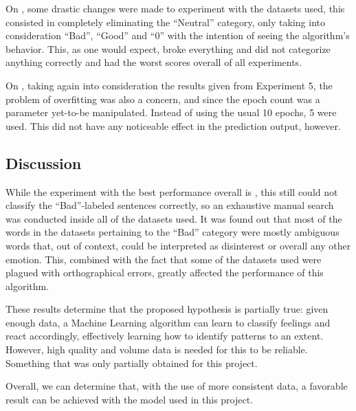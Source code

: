 On , some drastic changes were made to experiment with the datasets used, this consisted in completely eliminating the ``Neutral'' category, only taking into consideration ``Bad'', ``Good'' and ``0'' with the intention of seeing the algorithm's behavior. This, as one would expect, broke everything and did not categorize anything correctly and had the worst scores overall of all experiments. 

On , taking again into consideration the results given from Experiment 5, the problem of overfitting was also a concern, and since the epoch count was a parameter yet-to-be manipulated. Instead of using the usual 10 epochs, 5 were used. This did not have any noticeable effect in the prediction output, however.

\subsection{Discussion}
While the experiment with the best performance overall is , this still could not classify the ``Bad''-labeled sentences correctly, so an exhaustive manual search was conducted inside all of the datasets used. It was found out that most of the words in the datasets pertaining to the ``Bad'' category were mostly ambiguous words that, out of context, could be interpreted as disinterest or overall any other emotion. This, combined with the fact that some of the datasets used were plagued with orthographical errors, greatly affected the performance of this algorithm.

These results determine that the proposed hypothesis is partially true: given enough data, a Machine Learning algorithm can learn to classify feelings and react accordingly, effectively learning how to identify patterns to an extent. However, high quality and volume data is needed for this to be reliable. Something that was only partially obtained for this project.

Overall, we can determine that, with the use of more consistent data, a favorable result can be achieved with the model used in this project.